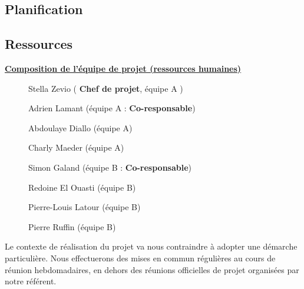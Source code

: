 \documentclass[a4paper, 12pt]{article}
\begin{document}
\subsection{Planification}

\noindent
\begin{minipage}{\linewidth}
\label{gantt}
\end{minipage}

\noindent
\begin{minipage}{\linewidth}
\label{gantt}
\end{minipage}

\noindent
\begin{minipage}{\linewidth}
\label{tâches}
\end{minipage}


\subsection{Ressources}
\underline{\textbf{Composition de l'équipe de projet (ressources humaines)}}

\begin{description}
 \item [] Stella Zevio ( \textbf{Chef de projet}, équipe A )
 \item [] Adrien Lamant (équipe A : \textbf{Co-responsable})
 \item [] Abdoulaye Diallo (équipe A)
 \item [] Charly Maeder (équipe A)
 \item [] Simon Galand (équipe B : \textbf{Co-responsable})
 \item [] Redoine El Ouasti (équipe B)
 \item [] Pierre-Louis Latour (équipe B)
 \item [] Pierre Ruffin (équipe B)
 
\end{description}


\par Le contexte de réalisation du projet va nous contraindre à adopter une démarche particulière. Nous effectuerons des mises en commun régulières au cours de réunion hebdomadaires, en dehors des réunions officielles de projet organisées par notre référent.
\end{document}
